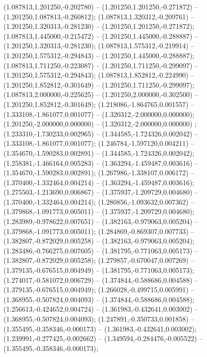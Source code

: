  (1.087813,1.201250,-0.202780) -- (1.201250,1.201250,-0.271872) -- (1.201250,1.087813,-0.260812);
 (1.087813,1.320312,-0.209761) -- (1.201250,1.320313,-0.281230) -- (1.201250,1.201250,-0.271872);
 (1.087813,1.445000,-0.215472) -- (1.201250,1.445000,-0.288887) -- (1.201250,1.320313,-0.281230);
 (1.087813,1.575312,-0.219914) -- (1.201250,1.575312,-0.294843) -- (1.201250,1.445000,-0.288887);
 (1.087813,1.711250,-0.223087) -- (1.201250,1.711250,-0.299097) -- (1.201250,1.575312,-0.294843);
 (1.087813,1.852812,-0.224990) -- (1.201250,1.852812,-0.301649) -- (1.201250,1.711250,-0.299097);
 (1.087813,2.000000,-0.225625) -- (1.201250,2.000000,-0.302500) -- (1.201250,1.852812,-0.301649);
 (1.218086,-1.864765,0.001557) -- (1.333108,-1.861077,0.001077) -- (1.320312,-2.000000,0.000000);
 (1.201250,-2.000000,0.000000) -- (1.320312,-2.000000,0.000000) ;
 (1.233310,-1.730233,0.002965) -- (1.344585,-1.724326,0.002042) -- (1.333108,-1.861077,0.001077);
 (1.246784,-1.597120,0.004211) -- (1.354670,-1.590283,0.002891) -- (1.344585,-1.724326,0.002042);
 (1.258381,-1.466164,0.005283) -- (1.363294,-1.459487,0.003616) -- (1.354670,-1.590283,0.002891);
 (1.267986,-1.338107,0.006172) -- (1.370400,-1.332464,0.004214) -- (1.363294,-1.459487,0.003616);
 (1.275503,-1.213690,0.006867) -- (1.375937,-1.209729,0.004680) -- (1.370400,-1.332464,0.004214);
 (1.280856,-1.093632,0.007362) -- (1.379868,-1.091773,0.005011) -- (1.375937,-1.209729,0.004680);
 (1.283989,-0.978622,0.007651) -- (1.382163,-0.979063,0.005204) -- (1.379868,-1.091773,0.005011);
 (1.284869,-0.869307,0.007733) -- (1.382807,-0.872029,0.005258) -- (1.382163,-0.979063,0.005204);
 (1.283486,-0.766275,0.007605) -- (1.381795,-0.771063,0.005173) -- (1.382807,-0.872029,0.005258);
 (1.279857,-0.670047,0.007269) -- (1.379135,-0.676515,0.004949) -- (1.381795,-0.771063,0.005173);
 (1.274017,-0.581072,0.006729) -- (1.374844,-0.588686,0.004588) -- (1.379135,-0.676515,0.004949);
 (1.266028,-0.499715,0.005991) -- (1.368955,-0.507824,0.004093) -- (1.374844,-0.588686,0.004588);
 (1.256613,-0.424652,0.004724) -- (1.361983,-0.432641,0.003002) -- (1.368955,-0.507824,0.004093);
 (1.247891,-0.350733,0.001858) -- (1.355495,-0.358346,-0.000173) -- (1.361983,-0.432641,0.003002);
 (1.239991,-0.277425,-0.002662) -- (1.349594,-0.284476,-0.005522) -- (1.355495,-0.358346,-0.000173);
